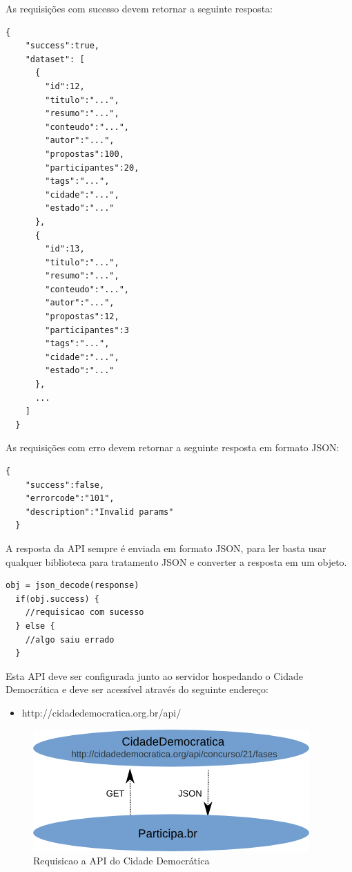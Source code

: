 \documentclass[12pt]{article}
\begin{document}
As requisições com sucesso devem retornar a seguinte resposta:


\begin{framed}
\begin{lstlisting}[caption=Exemplo de retorno JSON com a lista de todos os concursos]
  {
    "success":true,
    "dataset": [
      {
        "id":12,
        "titulo":"...",
        "resumo":"...",
        "conteudo":"...",
        "autor":"...",
        "propostas":100,
        "participantes":20,
        "tags":"...",
        "cidade":"...",
        "estado":"..."
      },
      {
        "id":13,
        "titulo":"...",
        "resumo":"...",
        "conteudo":"...",
        "autor":"...",
        "propostas":12,
        "participantes":3
        "tags":"...",
        "cidade":"...",
        "estado":"..."
      },
      ...
    ]
  }
\end{lstlisting}
\end{framed}

As requisições com erro devem retornar a seguinte resposta em formato JSON:

\begin{framed}
\begin{lstlisting}[caption=Exemplo de retorno JSON com erro]
  {
    "success":false,
    "errorcode":"101",
    "description":"Invalid params"
  }
\end{lstlisting}
\end{framed}

A resposta da API sempre é enviada em formato JSON, para ler basta usar
qualquer biblioteca para tratamento JSON e converter a resposta em um objeto.

\begin{framed}
\begin{lstlisting}[caption=Pseudo-código com exemplo de como tratar o retorno JSON]
  obj = json_decode(response)
  if(obj.success) {
    //requisicao com sucesso
  } else {
    //algo saiu errado
  }
\end{lstlisting}
\end{framed}

Esta API deve ser configurada junto ao servidor hospedando o Cidade
Democrática e deve ser acessível através do seguinte endereço:

\begin{itemize}
  \item http://cidadedemocratica.org.br/api/
\end{itemize}

\begin{figure}[h]
\center
\includegraphics[scale=0.5]{diagrama.png}
\caption{Requisicao a API do Cidade Democrática}
\label{diagrama}
\end{figure}
\end{document}
